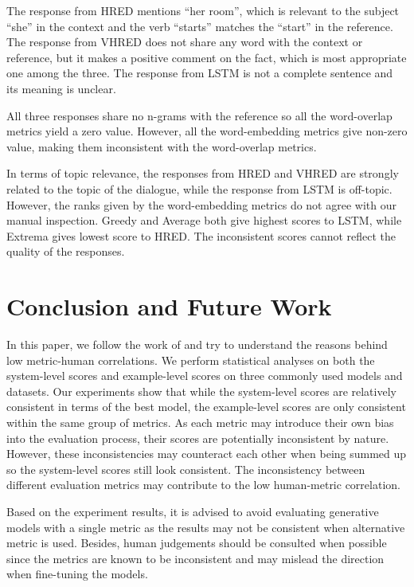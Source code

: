 \documentclass[conference]{IEEEtran}
\begin{document}
The response from HRED mentions ``her room'', which is relevant to the subject ``she'' in the context and the verb ``starts'' matches the ``start'' in the reference.
The response from VHRED does not share any word with the context or reference, but it makes a positive comment on the fact, which is most appropriate one among the three.
The response from LSTM is not a complete sentence and its meaning is unclear.

All three responses share no n-grams with the reference so all the word-overlap metrics yield a zero value.
However, all the word-embedding metrics give non-zero value, making them inconsistent with the word-overlap metrics.

In terms of topic relevance, the responses from HRED and VHRED are strongly related to the topic of the dialogue, while the response from LSTM is off-topic.
However, the ranks given by the word-embedding metrics do not agree with our manual inspection.
Greedy and Average both give highest scores to LSTM, while Extrema gives lowest score to HRED.
The inconsistent scores cannot reflect the quality of the responses.

\section{Conclusion and Future Work}
In this paper, we follow the work of \cite{HowNot} and try to understand the reasons behind low metric-human correlations.
We perform statistical analyses on both the system-level scores and example-level scores on three commonly used models and datasets.
Our experiments show that while the system-level scores are relatively consistent in terms of the best model,
the example-level scores are only consistent within the same group of metrics.
As each metric may introduce their own bias into the evaluation process, their scores are potentially inconsistent by nature.
However, these inconsistencies may counteract each other when being summed up so the system-level scores still look consistent.
The inconsistency between different evaluation metrics may contribute to the low human-metric correlation.

Based on the experiment results, it is advised to avoid evaluating generative models with a single metric as the results may not be
consistent when alternative metric is used. Besides, human judgements should be consulted when possible since
the metrics are known to be inconsistent and may mislead the direction when fine-tuning the models.
\end{document}
